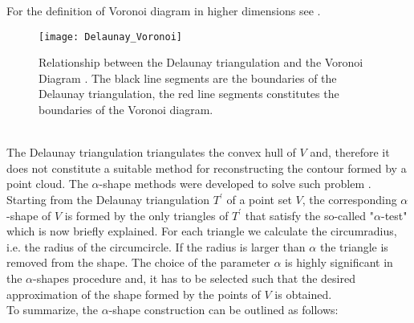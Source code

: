 For the definition of Voronoi diagram in higher dimensions see \cite{brown1979voronoi}.
\begin{figure}[h]
\centering
\texttt{[image: Delaunay\_Voronoi]}
\caption{Relationship between the Delaunay triangulation and the Voronoi Diagram \cite{Wiki4}. The black line segments are the boundaries of the Delaunay triangulation, the red line segments constitutes the boundaries of the Voronoi diagram.}
\label{fig:Voronoi}
\end{figure}
\\ \indent The Delaunay triangulation triangulates the convex hull of $V$ and, therefore it does not constitute a suitable method for reconstructing the contour formed by a point cloud. The $\alpha$-shape methods were developed to solve such problem \cite{edelsbrunner2010alpha, guo1997surface}. Starting from the Delaunay triangulation $T^\prime$ of a point set $V$, the corresponding $\alpha$-shape of $V$ is formed by the only triangles of $T^\prime$ that satisfy the so-called "$\alpha$-test" which is now briefly explained.
For each triangle we calculate the circumradius, i.e. the radius of the circumcircle. If the radius is larger than $\alpha$ the triangle is removed from the shape. The choice of the parameter $\alpha$ is highly significant in the $\alpha$-shapes procedure and, it has to be selected such that the desired approximation of the shape formed by the points of $V$ is obtained.\\ \indent
To summarize, the $\alpha$-shape construction can be outlined as follows:
